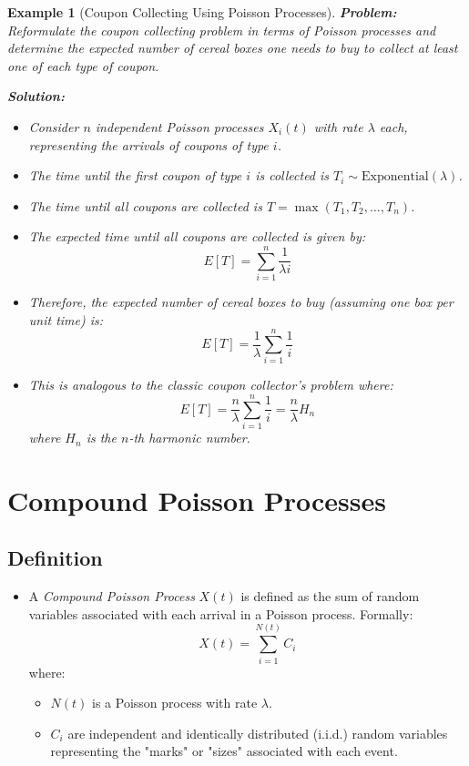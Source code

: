 \documentclass[12pt]{article}
\newtheorem{example}{Example}
\begin{document}
\begin{example}[Coupon Collecting Using Poisson Processes]
    \textbf{Problem:} Reformulate the coupon collecting problem in terms of Poisson processes and determine the expected number of cereal boxes one needs to buy to collect at least one of each type of coupon.
    
    \textbf{Solution:}
    \begin{itemize}
        \item Consider \( n \) independent Poisson processes \( X_i(t) \) with rate \( \lambda \) each, representing the arrivals of coupons of type \( i \).
        \item The time until the first coupon of type \( i \) is collected is \( T_i \sim \text{Exponential}(\lambda) \).
        \item The time until all coupons are collected is \( T = \max(T_1, T_2, \ldots, T_n) \).
        \item The expected time until all coupons are collected is given by:
        \[
        E[T] = \sum_{i=1}^{n} \frac{1}{\lambda i}
        \]
        \item Therefore, the expected number of cereal boxes to buy (assuming one box per unit time) is:
        \[
        E[T] = \frac{1}{\lambda} \sum_{i=1}^{n} \frac{1}{i}
        \]
        \item This is analogous to the classic coupon collector's problem where:
        \[
        E[T] = \frac{n}{\lambda} \sum_{i=1}^{n} \frac{1}{i} = \frac{n}{\lambda} H_n
        \]
        where \( H_n \) is the \( n \)-th harmonic number.
    \end{itemize}
\end{example}

\section{Compound Poisson Processes}

\subsection{Definition}
\begin{itemize}
    \item A \textit{Compound Poisson Process} \( X(t) \) is defined as the sum of random variables associated with each arrival in a Poisson process. Formally:
    \[
    X(t) = \sum_{i=1}^{N(t)} C_i
    \]
    where:
    \begin{itemize}
        \item \( N(t) \) is a Poisson process with rate \( \lambda \).
        \item \( C_i \) are independent and identically distributed (i.i.d.) random variables representing the "marks" or "sizes" associated with each event.
    \end{itemize}
\end{itemize}
\end{document}
